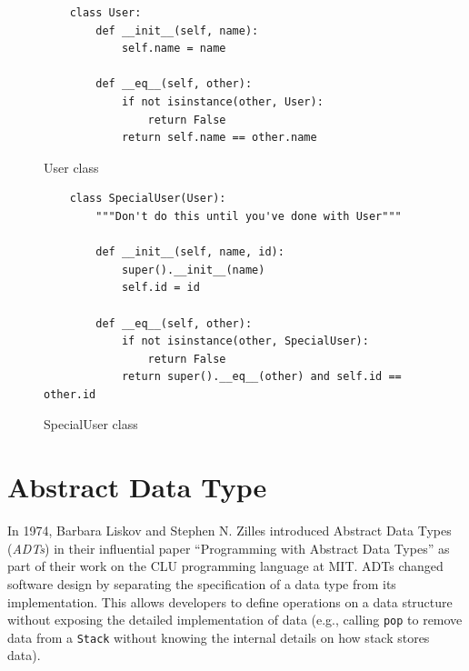 \documentclass[oneside,11pt,dvipsnames]{book}
\newcommand{\code}[1]{\texttt{#1}}
\begin{document}
    

\begin{figure}
\begin{lstlisting}
    class User:
        def __init__(self, name):
            self.name = name

        def __eq__(self, other):
            if not isinstance(other, User):
                return False
            return self.name == other.name
\end{lstlisting}
\caption{User class}\label{ex:user}
\end{figure}


\begin{figure}
\begin{lstlisting}
    class SpecialUser(User):
        """Don't do this until you've done with User"""

        def __init__(self, name, id):
            super().__init__(name)
            self.id = id

        def __eq__(self, other):
            if not isinstance(other, SpecialUser):
                return False
            return super().__eq__(other) and self.id == other.id
\end{lstlisting}
\caption{SpecialUser class}\label{ex:specialuser}
\end{figure}




\chapter{Abstract Data Type}\label{chap:adt}


In 1974, Barbara Liskov and Stephen N. Zilles introduced Abstract Data Types (\emph{ADTs}) in their influential paper ``Programming with Abstract Data Types'' as part of their work on the CLU programming language at MIT. ADTs changed software design by separating the specification of a data type from its implementation. This allows developers to define operations on a data structure without exposing the detailed implementation of data (e.g., calling \code{pop} to remove data from a \code{Stack} without knowing the internal details on how stack stores data). 
\end{document}
